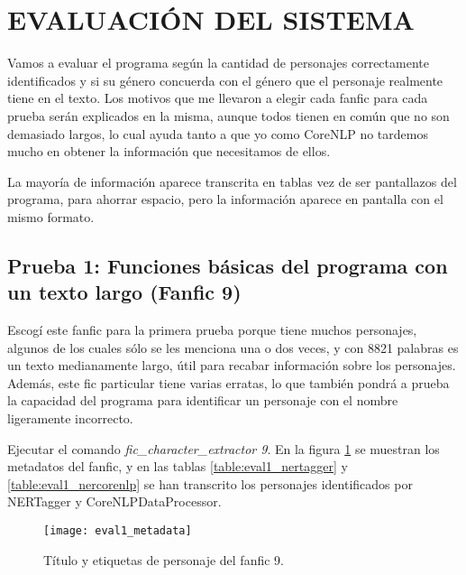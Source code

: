 \documentclass{pre-tfg}
\newcommand{\finalProgramName}{fic\_character\_extractor }
\begin{document}
\cleardoublepage
\section{EVALUACIÓN DEL SISTEMA}
\label{sec:evaluacion}

Vamos a evaluar el programa según la cantidad de personajes correctamente identificados y si su género concuerda con el género que el personaje realmente tiene en el texto. Los motivos que me llevaron a elegir cada fanfic para cada prueba serán explicados en la misma, aunque todos tienen en común que no son demasiado largos, lo cual ayuda tanto a que yo como CoreNLP no tardemos mucho en obtener la información que necesitamos de ellos.

La mayoría de información aparece transcrita en tablas vez de ser pantallazos del programa, para ahorrar espacio, pero la información aparece en pantalla con el mismo formato.

\subsection{Prueba 1: Funciones básicas del programa con un texto largo (Fanfic 9)}
Escogí este fanfic para la primera prueba porque tiene muchos personajes, algunos de los cuales sólo se les menciona una o dos veces, y con 8821 palabras es un texto medianamente largo, útil para recabar información sobre los personajes. Además, este fic particular tiene varias erratas, lo que también pondrá a prueba la capacidad del programa para identificar un personaje con el nombre ligeramente incorrecto.

Ejecutar el comando \textit{\finalProgramName 9}. En la figura \ref{fig:eval1_metadata} se muestran los metadatos del fanfic, y en las tablas \ref{table:eval1_nertagger} y \ref{table:eval1_nercorenlp} se han transcrito los personajes identificados por NERTagger y CoreNLPDataProcessor.

\begin{figure}[h]
	\centering
	\label{fig:eval1_metadata}
	\texttt{[image: eval1\_metadata]}
	\caption{Título y etiquetas de personaje del fanfic 9.}
\end{figure}
\end{document}
